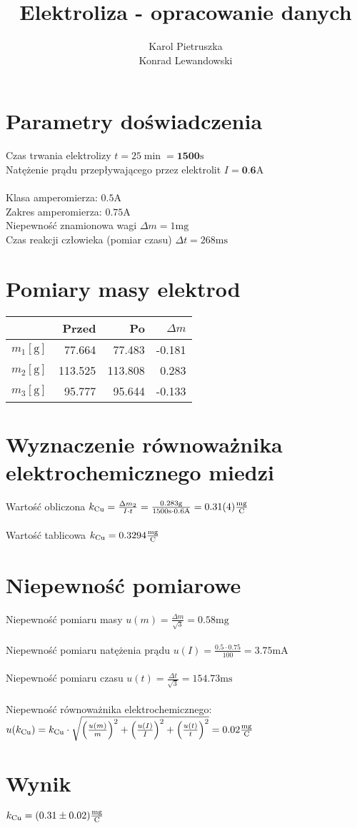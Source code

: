 \documentclass[12pt]{article}
\title{\textbf{Elektroliza - opracowanie danych}}
\author{Karol Pietruszka\\Konrad Lewandowski}
\date{}
\begin{document}
\maketitle

\section{Parametry doświadczenia}
Czas trwania elektrolizy $t = 25\si{\min} = \textbf{1500}\si{\s}$ \\
Natężenie prądu przepływającego przez elektrolit $I = \textbf{0.6}\si{\A}$\\
\\
Klasa amperomierza: $0.5\si{\A}$\\
Zakres amperomierza: $0.75\si{\A}$\\
Niepewność znamionowa wagi $\Delta m = 1\si{\mg}$\\
Czas reakcji człowieka (pomiar czasu) $\Delta t = 268\si{\ms}$
\section{Pomiary masy elektrod}

\begin{tabular}{|c|r|r|r|}
\hline
   & \textbf{Przed} & \textbf{Po} & \textbf{$\Delta m$} \\ \hline
$m_1 [\si{\g}]$ & 77.664  & 77.483  & -0.181            \\ \hline
$m_2 [\si{\g}]$ & 113.525 & 113.808 & 0.283 \\ \hline
$m_3 [\si{\g}]$ & 95.777  & 95.644  & -0.133       \\ \hline
\end{tabular}

\section{Wyznaczenie równoważnika elektrochemicznego miedzi}
Wartość obliczona $k_{\text{Cu}} = \frac{\Delta m_2}{I \cdot t} = \frac{0.283\si{\g}}{1500\si{\s} \cdot 0.6 \si{\A}} = 0.31(4)\si{\frac{\mg}{\coulomb}}$ \\\\
Wartość tablicowa $k_{\text{Cu}} = 0.3294\si{\frac{\mg}{\coulomb}}$

\section{Niepewność pomiarowe}
Niepewność pomiaru masy $u(m) = \frac{\Delta m}{\sqrt{3}} = 0.58\si{\mg}$\\\\
Niepewność pomiaru natężenia prądu $u(I) = \frac{0.5\cdot0.75}{100} = 3.75\si{\mA}$\\\\
Niepewność pomiaru czasu $u(t) = \frac{\Delta t}{\sqrt{3}} = 154.73\si{\ms}$\\\\
Niepewność równoważnika elektrochemicznego:\\
$u(k_{\text{Cu}}) = k_{\text{Cu}} \cdot \sqrt{\left(\frac{u(m)}{m}\right)^2 + \left(\frac{u(I)}{I}\right)^2 + \left(\frac{u(t)}{t}\right)^2} = 0.02\si{\frac{\mg}{\coulomb}}$
\section{Wynik}
$k_{\text{Cu}} = (0.31 \pm 0.02) \si{\frac{\mg}{\coulomb}}$
\end{document}
